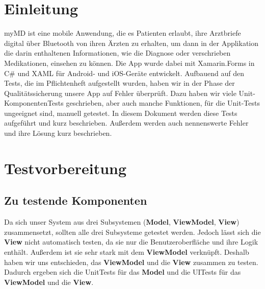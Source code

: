 \documentclass[a4paper]{scrreprt}
\begin{document}
\chapter{Einleitung}
\dq{}myMD\dq{} ist eine mobile Anwendung, die es Patienten erlaubt, ihre Arztbriefe digital über Bluetooth von ihren Ärzten zu erhalten, um dann in der Applikation die darin enthaltenen Informationen, wie die Diagnose oder verschrieben Medikationen, einsehen zu können. \newline
\newline
Die App wurde dabei mit Xamarin.Forms in C\# und XAML für Android- und iOS-Geräte entwickelt. 
\newline
\newline
Aufbauend auf den Tests, die im Pflichtenheft aufgestellt wurden, haben wir in der Phase der Qualitätssicherung unsere App auf Fehler überprüft. Dazu haben wir viele Unit-KomponentenTests geschrieben, aber auch manche Funktionen, für die Unit-Tests ungeeignet sind, manuell getestet.
\newline
\newline
In diesem Dokument werden diese Tests aufgeführt und kurz beschrieben. Außerdem werden auch nennenswerte Fehler und ihre Lösung kurz beschrieben.
\chapter{Testvorbereitung}
\section{Zu testende Komponenten}
Da sich unser System aus drei Subsystemen (\textbf{Model}, \textbf{ViewModel}, \textbf{View}) zusammensetzt, sollten alle drei Subsysteme getestet werden. Jedoch lässt sich die \textbf{View} nicht automatisch testen, da sie nur die Benutzeroberfläche und ihre Logik enthält. Außerdem ist sie sehr stark mit dem \textbf{ViewModel} verknüpft. Deshalb haben wir uns entschieden, das \textbf{ViewModel} und die \textbf{View} zusammen zu testen. Dadurch ergeben sich die UnitTests für das \textbf{Model} und die UITests für das \textbf{ViewModel} und die \textbf{View}.
\end{document}
